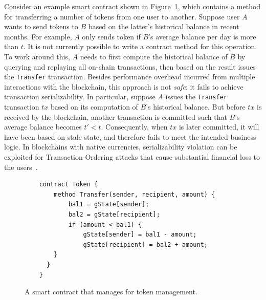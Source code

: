 Consider an example smart contract shown in Figure~\ref{code:prov:contract}, which contains a method for transferring a
number of tokens from one user to another. Suppose user $A$ wants to send tokens to $B$ based on the latter's
historical balance in recent months. For example, $A$ only sends token if $B$'s average balance per day is
more than $t$. It is not currently possible to write a contract method for this operation. To work around
this, $A$ needs to first compute the historical balance of $B$ by querying and replaying all on-chain
transactions, then based on the result issues the \texttt{Transfer} transaction. Besides performance
overhead incurred from multiple interactions with the blockchain, this approach is not {\em safe}: it fails to
achieve transaction serializability. In particular, suppose $A$ issues the \texttt{Transfer} transaction
$tx$ based on its computation of $B$'s historical balance. But before $tx$ is received by the
blockchain, another transaction is committed such that $B$'s average balance becomes $t' < t$. Consequently,
when $tx$ is later committed, it will have been based on stale state, and therefore fails to meet the intended
business logic. In blockchains with native currencies, serializability violation can be exploited for
Transaction-Ordering attacks that cause substantial financial loss to the users~\cite{luu2016making}.

\begin{figure}
    \footnotesize
    \centering
    \begin{verbatim}
    contract Token {
        method Transfer(sender, recipient, amount) {
            bal1 = gState[sender];
            bal2 = gState[recipient];
            if (amount < bal1) {
                gState[sender] = bal1 - amount;
                gState[recipient] = bal2 + amount;
        } 
      } 
    }
    \end{verbatim}
\caption{A smart contract that manages for token management.}
\label{code:prov:contract}
\end{figure}


